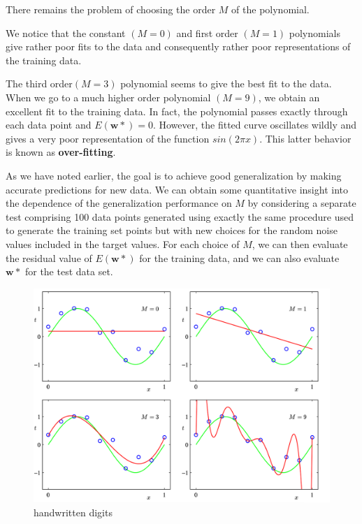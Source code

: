 There remains the problem of choosing the order $M$ of the polynomial.

We notice that the constant $(M = 0)$ and first order $(M = 1)$ polynomials give rather poor fits to the data and consequently rather poor representations of the training data.

The third order$(M = 3)$ polynomial seems to give the best fit to the data. When we go to a much higher order polynomial $(M = 9)$, we obtain an excellent fit to the training data. In fact, the polynomial passes exactly through each data point and $E(\pmb{w*}) = 0$. However, the fitted curve oscillates wildly and gives a very poor representation of the function $sin(2 \pi x)$. This latter behavior is known as \textbf{over-fitting}.




As we have noted earlier, the goal is to achieve good generalization by making accurate predictions for new data. We can obtain some quantitative insight into the dependence of the generalization performance on $M$ by considering a separate test comprising 100 data points generated using exactly the same procedure used to generate the training set points but with new choices for the random noise values included in the target values. For each choice of $M$, we can then evaluate the residual value of $E(\pmb{w*})$ for the training data, and we can also evaluate $\pmb{w*}$ for the test data set.


\begin{figure}[h]
    \centering
    \includegraphics[scale=0.25]{chapter006/figures/fig002}
    \caption{handwritten digits}
    \label{handwritten digits}
\end{figure}

